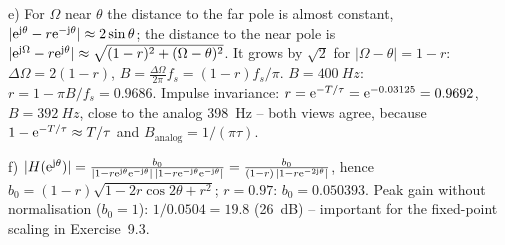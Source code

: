 \begin{solution}
e) For $\Omega$ near $\theta$ the distance to the far pole is almost constant,
$|\mathrm{e}^{\mathrm{j}\theta}-r\mathrm{e}^{-\mathrm{j}\theta}|\approx2\sin\theta$; the distance to the near
pole is $|\mathrm{e}^{\mathrm{j}\Omega}-r\mathrm{e}^{\mathrm{j}\theta}|\approx\sqrt{(1-r)^2+(\Omega-\theta)^2}$.
It grows by $\sqrt2$ for $|\Omega-\theta|=1-r$: $\Delta\Omega=2(1-r)$,
$B=\frac{\Delta\Omega}{2\pi}f_s=(1-r)f_s/\pi$. $B=\SI{400}{Hz}$:
$r=1-\pi B/f_s=0.9686$. Impulse invariance: $r=\mathrm{e}^{-T/\tau}=\mathrm{e}^{-0.03125}=0.9692$,
$B=\SI{392}{Hz}$, close to the analog \SI{398}{Hz} -- both views agree, because
$1-\mathrm{e}^{-T/\tau}\approx T/\tau$ and $B_\text{analog}=1/(\pi\tau)$.

f) $|H(\mathrm{e}^{\mathrm{j}\theta})|=\frac{b_0}{|1-r\mathrm{e}^{\mathrm{j}\theta}\mathrm{e}^{-\mathrm{j}\theta}|\,|1-r\mathrm{e}^{-\mathrm{j}\theta}\mathrm{e}^{-\mathrm{j}\theta}|}
=\frac{b_0}{(1-r)\,|1-r\mathrm{e}^{-2\mathrm{j}\theta}|}$, hence
$b_0=(1-r)\sqrt{1-2r\cos2\theta+r^2}$; $r=0.97$: $b_0=0.050393$. Peak gain
without normalisation ($b_0=1$): $1/0.0504=19.8$ (\SI{26}{dB}) -- important for
the fixed-point scaling in Exercise~9.3.
\end{solution}

